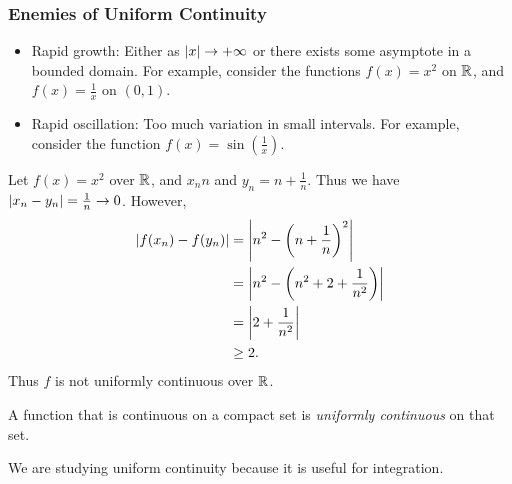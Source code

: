 \documentclass[class=article, crop=false]{standalone}
\begin{document}
  \subsubsection{Enemies of Uniform Continuity}
  \begin{itemize}
    \item Rapid growth: Either as $\left\lvert x \right\rvert\to+\infty$ or there exists some asymptote in a bounded domain. For example, consider the functions $f(x) = x^2$ on $\mathbb{R}$, and $f(x) = \frac{1}{x}$ on $(0, 1)$.
    \item Rapid oscillation: Too much variation in small intervals. For example, consider the function $f(x) = \sin(\frac{1}{x})$.
  \end{itemize}
  \begin{example}{}
    Let $f(x) = x^2$ over $\mathbb{R}$, and $x_n n$ and $y_n = n + \frac{1}{n}$. Thus we have $\left\lvert x_n - y_n \right\rvert = \frac{1}{n}\to 0$. However,
    \begin{align*}
      \left\lvert f(x_n) - f(y_n) \right\rvert &= \left\lvert n^2 - \left( n + \frac{1}{n} \right)^2 \right\rvert \\
                            &= \left\lvert n^2 - \left( n^2 + 2 + \frac{1}{n^2} \right) \right\rvert \\
                            &= \left\lvert 2 + \frac{1}{n^2} \right\rvert \\
                            &\geq 2.
    \end{align*}
    Thus $f$ is not uniformly continuous over $\mathbb{R}$.
  \end{example}
  \begin{theorem}{4.23}
    A function that is continuous on a compact set is \emph{uniformly continuous} on that set.
  \end{theorem}
  We are studying uniform continuity because it is useful for integration.
\end{document}
